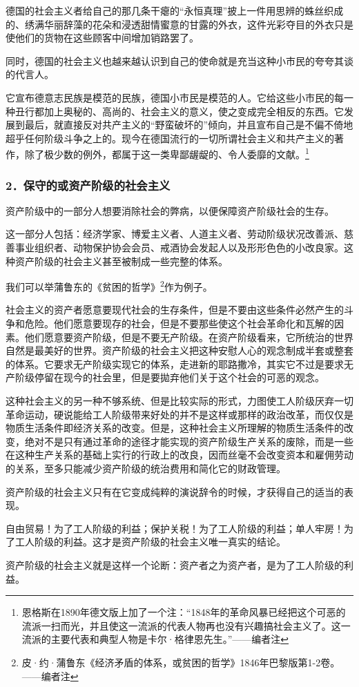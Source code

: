 \documentclass[UTF8,zihao=-4,a4paper]{ctexart}
\begin{document}
德国的社会主义者给自己的那几条干瘪的“永恒真理”披上一件用思辨的蛛丝织成的、绣满华丽辞藻的花朵和浸透甜情蜜意的甘露的外衣，这件光彩夺目的外衣只是使他们的货物在这些顾客中间增加销路罢了。\par
同时，德国的社会主义也越来越认识到自己的使命就是充当这种小市民的夸夸其谈的代言人。\par
它宣布德意志民族是模范的民族，德国小市民是模范的人。它给这些小市民的每一种丑行都加上奥秘的、高尚的、社会主义的意义，使之变成完全相反的东西。它发展到最后，就直接反对共产主义的“野蛮破坏的”倾向，并且宣布自己是不偏不倚地超乎任何阶级斗争之上的。现今在德国流行的一切所谓社会主义和共产主义的著作，除了极少数的例外，都属于这一类卑鄙龌龊的、令人委靡的文献。\footnote{恩格斯在1890年德文版上加了一个注：“1848年的革命风暴已经把这个可恶的流派一扫而光，并且使这一流派的代表人物再也没有兴趣搞社会主义了。这一流派的主要代表和典型人物是卡尔·格律恩先生。”——编者注}\par
\subsubsection*{2．保守的或资产阶级的社会主义}
资产阶级中的一部分人想要消除社会的弊病，以便保障资产阶级社会的生存。\par
这一部分人包括：经济学家、博爱主义者、人道主义者、劳动阶级状况改善派、慈善事业组织者、动物保护协会会员、戒酒协会发起人以及形形色色的小改良家。这种资产阶级的社会主义甚至被制成一些完整的体系。\par
我们可以举蒲鲁东的《贫困的哲学》\footnote{皮·约·蒲鲁东《经济矛盾的体系，或贫困的哲学》1846年巴黎版第1-2卷。——编者注}作为例子。\par
社会主义的资产者愿意要现代社会的生存条件，但是不要由这些条件必然产生的斗争和危险。他们愿意要现存的社会，但是不要那些使这个社会革命化和瓦解的因素。他们愿意要资产阶级，但是不要无产阶级。在资产阶级看来，它所统治的世界自然是最美好的世界。资产阶级的社会主义把这种安慰人心的观念制成半套或整套的体系。它要求无产阶级实现它的体系，走进新的耶路撒冷，其实它不过是要求无产阶级停留在现今的社会里，但是要拋弃他们关于这个社会的可恶的观念。\par
这种社会主义的另一种不够系统、但是比较实际的形式，力图使工人阶级厌弃一切革命运动，硬说能给工人阶级带来好处的并不是这样或那样的政治改革，而仅仅是物质生活条件即经济关系的改变。但是，这种社会主义所理解的物质生活条件的改变，绝对不是只有通过革命的途径才能实现的资产阶级生产关系的废除，而是一些在这种生产关系的基础上实行的行政上的改良，因而丝毫不会改变资本和雇佣劳动的关系，至多只能减少资产阶级的统治费用和简化它的财政管理。\par
资产阶级的社会主义只有在它变成纯粹的演说辞令的时候，才获得自己的适当的表现。\par
自由贸易！为了工人阶级的利益；保护关税！为了工人阶级的利益；单人牢房！为了工人阶级的利益。这才是资产阶级的社会主义唯一真实的结论。\par
资产阶级的社会主义就是这样一个论断：资产者之为资产者，是为了工人阶级的利益。\par
\end{document}
